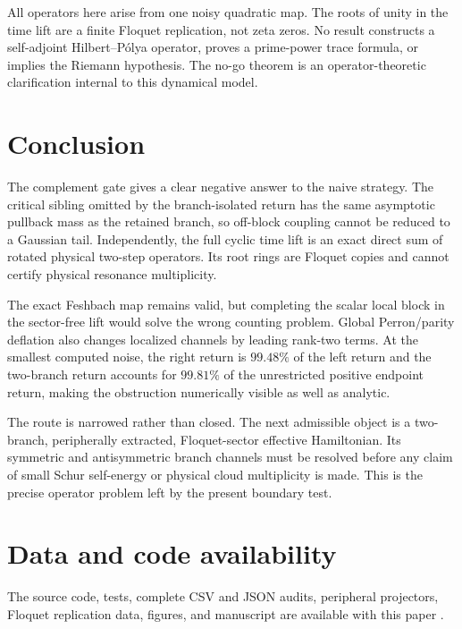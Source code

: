 \documentclass[11pt]{article}
\theoremstyle{definition}
\theoremstyle{remark}
\begin{document}
All operators here arise from one noisy quadratic map.  The roots of unity
in the time lift are a finite Floquet replication, not zeta zeros.  No result
constructs a self-adjoint Hilbert--P\'olya operator, proves a prime-power
trace formula, or implies the Riemann hypothesis.  The no-go theorem is an
operator-theoretic clarification internal to this dynamical model.

\section{Conclusion}

The complement gate gives a clear negative answer to the naive strategy.
The critical sibling omitted by the branch-isolated return has the same
asymptotic pullback mass as the retained branch, so off-block coupling cannot
be reduced to a Gaussian tail.  Independently, the full cyclic time lift is
an exact direct sum of rotated physical two-step operators.  Its root rings
are Floquet copies and cannot certify physical resonance multiplicity.

The exact Feshbach map remains valid, but completing the scalar local block
in the sector-free lift would solve the wrong counting problem.  Global
Perron/parity deflation also changes localized channels by leading rank-two
terms.  At the smallest computed noise, the right return is $99.48\%$ of the
left return and the two-branch return accounts for $99.81\%$ of the
unrestricted positive endpoint return, making the obstruction numerically
visible as well as analytic.

The route is narrowed rather than closed.  The next admissible object is a
two-branch, peripherally extracted, Floquet-sector effective Hamiltonian.  Its
symmetric and antisymmetric branch channels must be resolved before any
claim of small Schur self-energy or physical cloud multiplicity is made.
This is the precise operator problem left by the present boundary test.

\section*{Data and code availability}

The source code, tests, complete CSV and JSON audits, peripheral projectors,
Floquet replication data, figures, and manuscript are available with this
paper \citep{WangComplementCode2026}.



\end{document}
